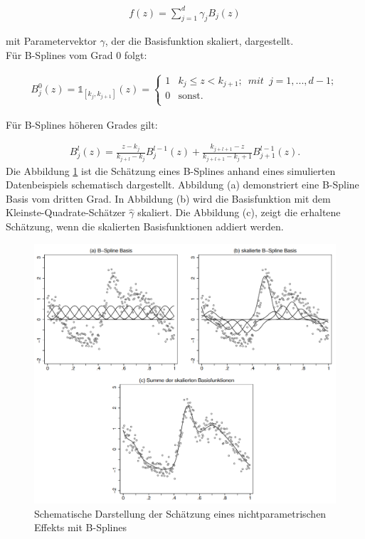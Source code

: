 \documentclass[12pt]{scrreprt}
\begin{document}
\begin{align}
f(z)=\sum_{j=1}^d\gamma_{j}B_{j}(z)
\end{align}

mit Parametervektor $\gamma$, der die Basisfunktion skaliert, dargestellt. \\

Für B-Splines vom Grad 0 folgt:



\begin{align}
B_{j}^0(z)= \mathbb{1}_{[k_{j},k_{j+1}]}(z)= 
\begin{cases}
1 & k_{j} \leq z<k_{j+1};\enspace mit\enspace j=1,...,d-1; \\
0 & \text{sonst.} \\
\end{cases}
\end{align}



\newpage

\noindent Für B-Splines höheren Grades gilt:



\begin{align}
B_{j}^l(z)= \frac{z-k_{j}}{k_{j+l}-k_{j}}B_{j}^{l-1}(z)+
\frac{k_{j+l+1}-z}{k_{j+l+1}-k_j+1}B_{j+1}^{l-1}(z).
\end{align}
Die Abbildung \ref{pic:b_spline} ist die Schätzung eines B-Splines anhand eines simulierten Datenbeispiels schematisch dargestellt. Abbildung (a) demonstriert eine B-Spline Basis vom dritten Grad. In Abbildung (b) wird die Basisfunktion mit dem Kleinste-Quadrate-Schätzer $\hat\gamma$ skaliert. Die Abbildung (c), zeigt die erhaltene Schätzung, wenn die skalierten Basisfunktionen addiert werden.

\begin{figure}[H]
\centering
\includegraphics[width=.9\textwidth]{b_spline}
\caption{Schematische Darstellung der Schätzung eines nichtparametrischen Effekts mit B-Splines}
\label{pic:b_spline}
\end{figure}
\end{document}
